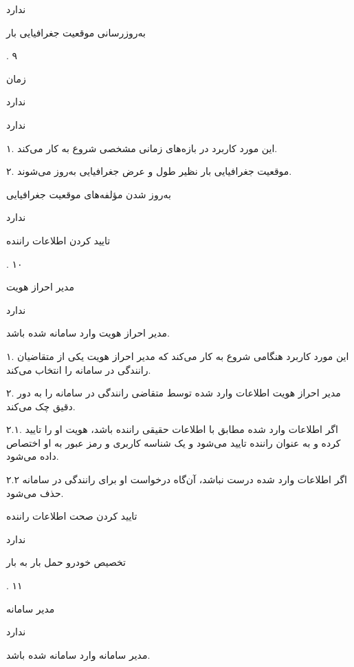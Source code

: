 ندارد

\newpage

به‌روزرسانی موقعیت جغرافیایی بار

.
۹

زمان

ندارد

ندارد


۱. این مورد کاربرد در بازه‌های زمانی مشخصی شروع به کار می‌کند.

۲. موقعیت جغرافیایی بار نظیر طول و عرض جغرافیایی به‌روز می‌شوند.

به‌روز شدن مؤلفه‌های موقعیت جغرافیایی	

ندارد

\newpage

تایید کردن اطلاعات راننده

.
۱۰

مدیر احراز هویت

ندارد

مدیر احراز هویت وارد سامانه شده باشد.


۱. این مورد کاربرد هنگامی شروع به کار می‌کند که مدیر احراز هویت یکی از متقاضیان رانندگی در سامانه را انتخاب می‌کند.

۲. مدیر احراز هویت اطلاعات وارد شده توسط متقاضی رانندگی در سامانه را به دور دقیق چک می‌کند.

۲.۱. اگر اطلاعات وارد شده مطابق با اطلاعات حقیقی راننده باشد، هویت او را تایید کرده و به عنوان راننده تایید می‌شود و یک شناسه کاربری و رمز عبور به او اختصاص داده می‌شود.

۲.۲ اگر اطلاعات وارد شده درست نباشد، آن‌گاه درخواست او برای رانندگی در سامانه حذف می‌شود.

تایید کردن صحت اطلاعات راننده

ندارد

\newpage

تخصیص خودرو حمل بار به بار

.
۱۱

مدیر سامانه

ندارد


مدیر سامانه وارد سامانه شده باشد. 

